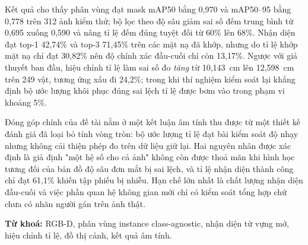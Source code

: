 Kết quả cho thấy phân vùng đạt mask mAP50 bằng 0,970 và mAP50--95 bằng 0,778 trên 312 ảnh kiểm
thử; bộ lọc theo độ sâu giảm sai số đếm trung bình từ 0,695 xuống 0,590 và nâng tỉ lệ đếm đúng
tuyệt đối từ 60\% lên 68\%. Nhận diện đạt top-1 42,74\% và top-3 71,45\% trên các mặt nạ đã
khớp, nhưng do tỉ lệ khớp mặt nạ chỉ đạt 30,82\% nên độ chính xác đầu-cuối chỉ còn 13,17\%.
Ngược với giả thuyết ban đầu, hiệu chỉnh tỉ lệ làm sai số đo \emph{tăng} từ 10,143~cm lên
12,598~cm trên 249 vật, tương ứng xấu đi 24,2\%; trong khi thí nghiệm kiểm soát lại khẳng định
bộ ước lượng khôi phục đúng sai lệch tỉ lệ được bơm vào trong phạm vi khoảng 5\%.

Đóng góp chính của đề tài nằm ở một kết luận âm tính thu được từ một thiết kế đánh giá đã loại bỏ tính vòng tròn: bộ ước lượng tỉ lệ đạt bài kiểm soát độ nhạy nhưng không cải thiện phép đo trên dữ liệu giữ lại. Hai nguyên nhân được xác định là giả định "một hệ số cho cả ảnh" không còn được thoả mãn khi hình học tương đối của bản đồ độ sâu đơn mắt bị sai lệch, và tỉ lệ nhận diện thành công chỉ đạt 61,1\% khiến tập phiếu bị nhiễu. Hạn chế
lớn nhất là chất lượng nhận diện đầu-cuối và việc phần quan hệ không gian mới chỉ có kiểm soát
tổng hợp chứ chưa có nhãn người gán trên ảnh thật.

\vspace{0.5cm}
\noindent\textbf{Từ khoá:} RGB-D, phân vùng instance class-agnostic, nhận diện từ vựng mở,
hiệu chỉnh tỉ lệ, đồ thị cảnh, kết quả âm tính.
